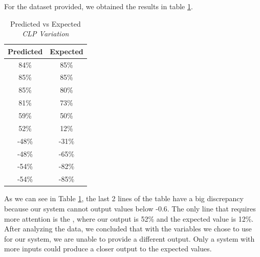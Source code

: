 For the dataset provided, we obtained the results in table \ref{tab:RESULTS_CLP}.
\begin{table}[H]
    \begin{center}
        \begin{tabular}{ |c|c| }
            \hline
            Predicted & Expected \\
            \hline
            84\% & 85\% \\
            85\% & 85\% \\
            85\% & 80\% \\
            81\% & 73\% \\
            59\% & 50\% \\
            52\% & 12\% \\
            -48\% & -31\% \\
            -48\% & -65\% \\
            -54\% & -82\% \\
            -54\% & -85\% \\
            \hline
        \end{tabular}
        \caption{Predicted vs Expected \textit{CLP Variation}}
        \label{tab:RESULTS_CLP}
    \end{center}
\end{table}

As we can see in Table \ref{tab:RESULTS_CLP}, the last 2 lines of the table have a big discrepancy because our system cannot output values below -0.6. The only line that requires more attention is the , where our output is 52\% and the expected value is 12\%. After analyzing the data, we concluded that with the variables we chose to use for our system, we are unable to provide a different output. Only a system with more inputs could produce a closer output to the expected values.
